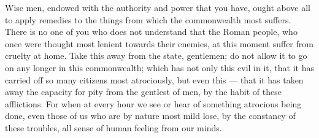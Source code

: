  Wise men, endowed with the authority and power that you have, ought above all to apply remedies to the things from which the commonwealth most suffers. There is no one of you who does not understand that the Roman people, who once were thought most lenient towards their enemies, at this moment suffer from cruelty at home. Take this away from the state, gentlemen; do not allow it to go on any longer in this commonwealth; which has not only this evil in it, that it has carried off so many citizens most atrociously, but even this --- that it has taken away the capacity for pity from the gentlest of men, by the habit of these afflictions. For when at every hour we see or hear of something atrocious being done, even those of us who are by nature most mild lose, by the constancy of these troubles, all sense of human feeling from our minds.
